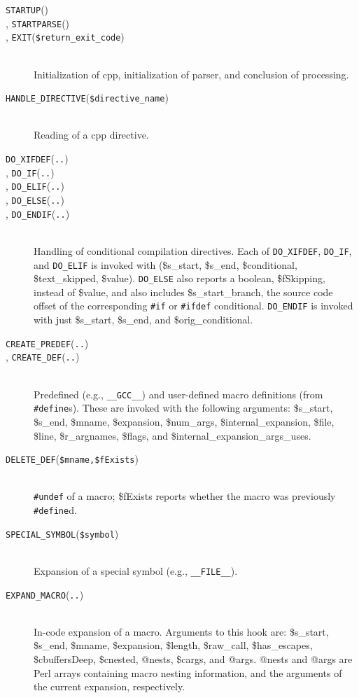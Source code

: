 \documentclass{article}
\newcommand{\Cpp}{\mbox{\textsf{cpp}}}
\newcommand{\Perl}{\mbox{Perl}}
\newcommand{\hook}[2]{\texttt{#1}(\texttt{#2}) \\ }
\newcommand{\shook}[1]{\texttt{#1}}
\newcommand{\ppd}[1]{\texttt{\##1}}
\newcommand{\eg}{e.g.,}
\begin{document}
\begin{description}
\item[\hook{STARTUP}{}, \hook{STARTPARSE}{}, \hook{EXIT}{\$return\_\-exit\_\-code}] ~ \\
  Initialization of \Cpp{}, initialization of parser, and conclusion of processing.

\item[\hook{HANDLE\_DIRECTIVE}{\$directive\_\-name}] ~ \\
  Reading of a \Cpp{} directive.

\item[\hook{DO\_XIFDEF}{..}, \hook{DO\_IF}{..}, \hook{DO\_ELIF}{..},
      \hook{DO\_ELSE}{..}, \hook{DO\_ENDIF}{..}] ~ \\
  Handling of conditional compilation directives.  Each of
  \shook{DO\_XIFDEF}, \shook{DO\_IF}, and \shook{DO\_ELIF} is invoked
  with (\$s\_\-start, \$s\_\-end, \$conditional, \$text\_skipped,
  \$value). \shook{DO\_ELSE} also reports a boolean, \$fSkipping,
  instead of \$value, and also includes \$s\_start\_\-branch, the source 
  code offset of the corresponding \ppd{if} or \ppd{ifdef} conditional.
  \shook{DO\_ENDIF} is invoked with just \$s\_\-start, \$s\_\-end, and
  \$orig\_conditional.

\item[\hook{CREATE\_PREDEF}{..}, \hook{CREATE\_DEF}{..}] ~ \\
  Predefined (\eg{} \verb+__GCC__+) and
  user-defined macro definitions (from \ppd{define}s).  These are
  invoked with the following arguments:
  \$s\_\-start, \$s\_\-end, \$mname, \$expansion, \$num\_\-args, 
  \$internal\_\-expansion, \$file, \$line, \$r\_\-argnames, \$flags, and
  \$internal\_\-expansion\_\-args\_\-uses.

\item[\hook{DELETE\_DEF}{\$mname,\$fExists}] ~ \\
  \ppd{undef} of a macro;  \$fExists reports whether the macro was
  previously \ppd{define}d.

\item[\hook{SPECIAL\_SYMBOL}{\$symbol}] ~ \\
  Expansion of a special symbol (\eg{} \verb+__FILE__+).

\item[\hook{EXPAND\_MACRO}{..}] ~ \\
  In-code expansion of a macro.  Arguments to this hook are:
\$s\_\-start, \$s\_\-end, \$mname, \$expansion, \$length, \$raw\_\-call,
\$has\_\-escapes, \$cbuffersDeep, \$cnested, @nests, \$cargs, and
@args.  @nests and @args are \Perl{} arrays containing macro nesting
information, and the arguments of the current expansion, respectively.


\end{description}
\end{document}
